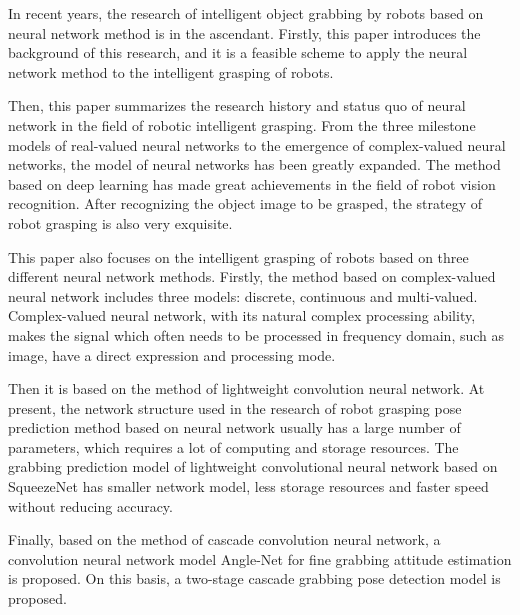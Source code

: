 \documentclass{hitszthesis}
\begin{document}
\begin{abstracten}

In recent years, the research of intelligent object grabbing by robots based on neural network method is in the ascendant. Firstly, this paper introduces the background of this research, and it is a feasible scheme to apply the neural network method to the intelligent grasping of robots. 

Then, this paper summarizes the research history and status quo of neural network in the field of robotic intelligent grasping. From the three milestone models of real-valued neural networks to the emergence of complex-valued neural networks, the model of neural networks has been greatly expanded. The method based on deep learning has made great achievements in the field of robot vision recognition. After recognizing the object image to be grasped, the strategy of robot grasping is also very exquisite. 

This paper also focuses on the intelligent grasping of robots based on three different neural network methods. Firstly, the method based on complex-valued neural network includes three models: discrete, continuous and multi-valued. Complex-valued neural network, with its natural complex processing ability, makes the signal which often needs to be processed in frequency domain, such as image, have a direct expression and processing mode. 

Then it is based on the method of lightweight convolution neural network. At present, the network structure used in the research of robot grasping pose prediction method based on neural network usually has a large number of parameters, which requires a lot of computing and storage resources. The grabbing prediction model of lightweight convolutional neural network based on SqueezeNet has smaller network model, less storage resources and faster speed without reducing accuracy. 

Finally, based on the method of cascade convolution neural network, a convolution neural network model Angle-Net for fine grabbing attitude estimation is proposed. On this basis, a two-stage cascade grabbing pose detection model is proposed.

\end{abstracten}

\tableofcontents

\mainmatter
\end{document}
